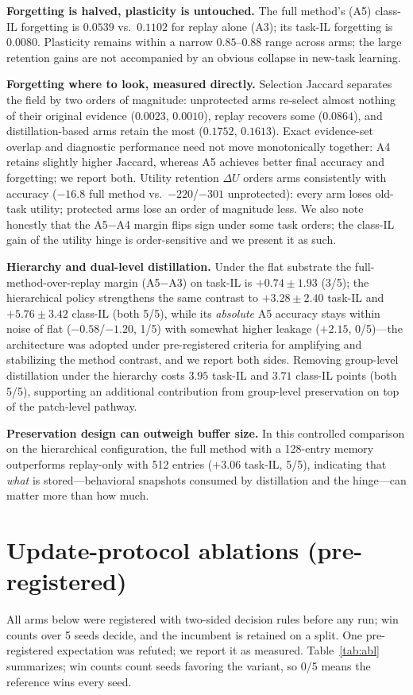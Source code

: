 \documentclass{article}
\begin{document}
\textbf{Forgetting is halved, plasticity is untouched.} The full method's (A5) class-IL forgetting is $0.0539$ vs.\ $0.1102$ for replay alone (A3); its task-IL forgetting is $0.0080$. Plasticity remains within a narrow $0.85$--$0.88$ range across arms; the large retention gains are not accompanied by an obvious collapse in new-task learning.

\textbf{Forgetting where to look, measured directly.} Selection Jaccard separates the field by two orders of magnitude: unprotected arms re-select almost nothing of their original evidence ($0.0023$, $0.0010$), replay recovers some ($0.0864$), and distillation-based arms retain the most ($0.1752$, $0.1613$). Exact evidence-set overlap and diagnostic performance need not move monotonically together: A4 retains slightly higher Jaccard, whereas A5 achieves better final accuracy and forgetting; we report both. Utility retention $\Delta U$ orders arms consistently with accuracy ($-16.8$ full method vs.\ $-220$/$-301$ unprotected): every arm loses old-task utility; protected arms lose an order of magnitude less. We also note honestly that the A5$-$A4 margin flips sign under some task orders; the class-IL gain of the utility hinge is order-sensitive and we present it as such.

\textbf{Hierarchy and dual-level distillation.} Under the flat substrate the full-method-over-replay margin (A5$-$A3) on task-IL is $+0.74{\pm}1.93$ (3/5); the hierarchical policy strengthens the same contrast to $+3.28{\pm}2.40$ task-IL and $+5.76{\pm}3.42$ class-IL (both 5/5), while its \emph{absolute} A5 accuracy stays within noise of flat ($-0.58$/$-1.20$, 1/5) with somewhat higher leakage ($+2.15$, 0/5)---the architecture was adopted under pre-registered criteria for amplifying and stabilizing the method contrast, and we report both sides. Removing group-level distillation under the hierarchy costs $3.95$ task-IL and $3.71$ class-IL points (both 5/5), supporting an additional contribution from group-level preservation on top of the patch-level pathway.

\textbf{Preservation design can outweigh buffer size.} In this controlled comparison on the hierarchical configuration, the full method with a 128-entry memory outperforms replay-only with 512 entries ($+3.06$ task-IL, 5/5), indicating that \emph{what} is stored---behavioral snapshots consumed by distillation and the hinge---can matter more than how much.

\section{Update-protocol ablations (pre-registered)}
\label{sec:ablations}
All arms below were registered with two-sided decision rules before any run; win counts over 5 seeds decide, and the incumbent is retained on a split. One pre-registered expectation was refuted; we report it as measured. Table~\ref{tab:abl} summarizes; win counts count seeds favoring the variant, so 0/5 means the reference wins every seed.
\end{document}
